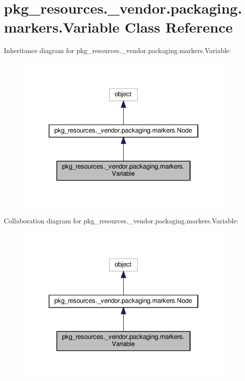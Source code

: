 \hypertarget{classpkg__resources_1_1__vendor_1_1packaging_1_1markers_1_1Variable}{}\section{pkg\+\_\+resources.\+\_\+vendor.\+packaging.\+markers.\+Variable Class Reference}
\label{classpkg__resources_1_1__vendor_1_1packaging_1_1markers_1_1Variable}


Inheritance diagram for pkg\+\_\+resources.\+\_\+vendor.\+packaging.\+markers.\+Variable\+:
\nopagebreak
\begin{figure}[H]
\begin{center}
\leavevmode
\includegraphics[width=310pt]{classpkg__resources_1_1__vendor_1_1packaging_1_1markers_1_1Variable__inherit__graph}
\end{center}
\end{figure}


Collaboration diagram for pkg\+\_\+resources.\+\_\+vendor.\+packaging.\+markers.\+Variable\+:
\nopagebreak
\begin{figure}[H]
\begin{center}
\leavevmode
\includegraphics[width=310pt]{classpkg__resources_1_1__vendor_1_1packaging_1_1markers_1_1Variable__coll__graph}
\end{center}
\end{figure}

